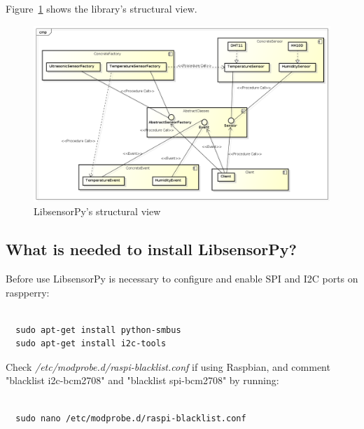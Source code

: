 \documentclass{acm_proc_article-sp}
\begin{document}
Figure~\ref{fig:view} shows the library's structural view.
\begin{figure}[ht]
\centering
    \includegraphics[width=1.0\textwidth,natwidth=610,natheight=642]{pictures/VisaoEstrutural.png}
    \caption{LibsensorPy's structural view}
    \label{fig:view}
\end{figure}

\subsection{What is needed to install LibsensorPy?}
Before use LibsensorPy is necessary to configure and enable SPI and I2C ports on raspperry:
\renewcommand{\theFancyVerbLine}{
  \sffamily\textcolor[rgb]{0.5,0.5,0.5}{\scriptsize\arabic{FancyVerbLine}}}
\begin{verbatim}

  sudo apt-get install python-smbus
  sudo apt-get install i2c-tools	

\end{verbatim}

Check \textit{/etc/modprobe.d/raspi-blacklist.conf} if using Raspbian, and comment "blacklist i2c-bcm2708" and "blacklist spi-bcm2708" by running:

\renewcommand{\theFancyVerbLine}{
  \sffamily\textcolor[rgb]{0.5,0.5,0.5}{\scriptsize\arabic{FancyVerbLine}}}
\begin{verbatim}

  sudo nano /etc/modprobe.d/raspi-blacklist.conf	

\end{verbatim}
\end{document}
